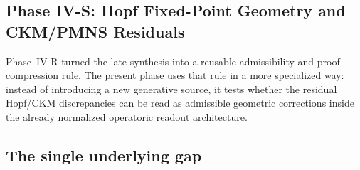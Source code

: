 

\subsection*{Phase IV-S: Hopf Fixed-Point Geometry and CKM/PMNS Residuals}
\label{sec:hopf_ckm}

\begin{remark}\label{rem:transition_r_to_s}
Phase~IV-R turned the late synthesis into a reusable admissibility and proof-compression rule. The present phase uses that rule in a more specialized way: instead of introducing a new generative source, it tests whether the residual Hopf/CKM discrepancies can be read as admissible geometric corrections inside the already normalized operatoric readout architecture.
\end{remark}

\subsection{The single underlying gap}

